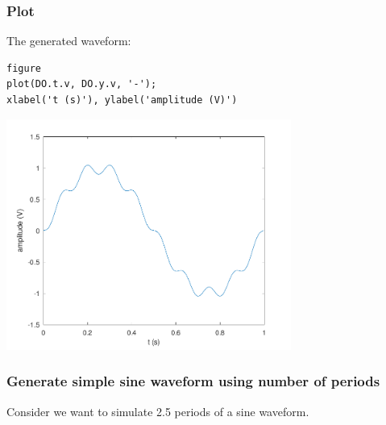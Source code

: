 \subsubsection*{Plot}



The generated waveform:

\begin{lstlisting}
figure
plot(DO.t.v, DO.y.v, '-');
xlabel('t (s)'), ylabel('amplitude (V)')
\end{lstlisting}
\begin{center}
\includegraphics[width=0.7\textwidth]{algs_examples_published/GenNHarm_alg_example-1.pdf}
\end{center}


{}
\subsubsection*{Generate simple sine waveform using number of periods}



Consider we want to simulate 2.5 periods of a sine waveform.

